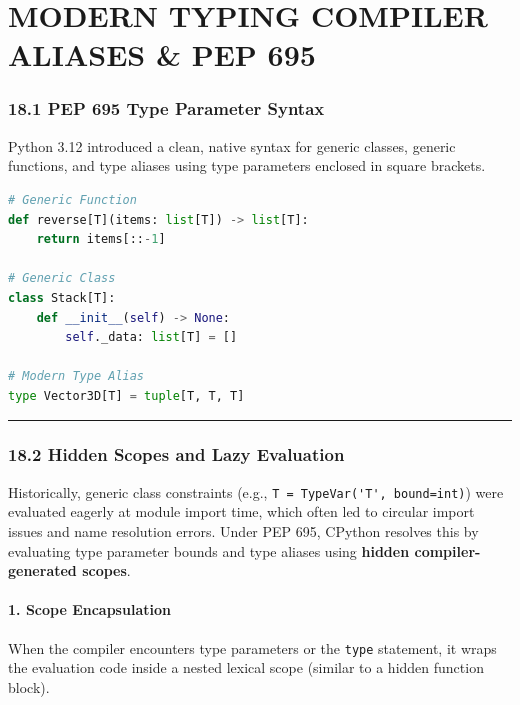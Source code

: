 \hypertarget{modern-typing-compiler-aliases-pep-695}{%
\chapter{MODERN TYPING COMPILER ALIASES \& PEP
695}\label{modern-typing-compiler-aliases-pep-695}}

\hypertarget{pep-695-type-parameter-syntax}{%
\subsection{18.1 PEP 695 Type Parameter
Syntax}\label{pep-695-type-parameter-syntax}}

Python 3.12 introduced a clean, native syntax for generic classes,
generic functions, and type aliases using type parameters enclosed in
square brackets.

\begin{lstlisting}[language=Python]
# Generic Function
def reverse[T](items: list[T]) -> list[T]:
    return items[::-1]

# Generic Class
class Stack[T]:
    def __init__(self) -> None:
        self._data: list[T] = []

# Modern Type Alias
type Vector3D[T] = tuple[T, T, T]
\end{lstlisting}

\begin{center}\rule{0.5\linewidth}{0.5pt}\end{center}

\hypertarget{hidden-scopes-and-lazy-evaluation}{%
\subsection{18.2 Hidden Scopes and Lazy
Evaluation}\label{hidden-scopes-and-lazy-evaluation}}

Historically, generic class constraints (e.g.,
\passthrough{\lstinline!T = TypeVar('T', bound=int)!}) were evaluated
eagerly at module import time, which often led to circular import issues
and name resolution errors. Under PEP 695, CPython resolves this by
evaluating type parameter bounds and type aliases using \textbf{hidden
compiler-generated scopes}.

\hypertarget{scope-encapsulation}{%
\subsubsection{1. Scope Encapsulation}\label{scope-encapsulation}}

When the compiler encounters type parameters or the
\passthrough{\lstinline!type!} statement, it wraps the evaluation code
inside a nested lexical scope (similar to a hidden function block).

